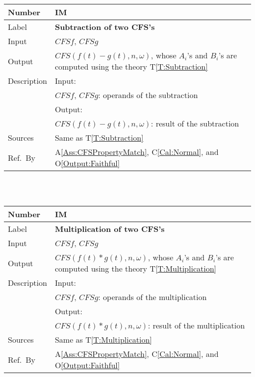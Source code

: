 \documentclass[12pt]{article}
\newcommand{\colAwidth}{0.13\textwidth}
\newcommand{\colBwidth}{0.82\textwidth}
\newcommand{\tref}[1]{T\ref{#1}}
\newcounter{instnum} %
\newcommand{\aref}[1]{A\ref{#1}}
\newcommand{\calref}[1]{C\ref{#1}}
\newcommand{\oref}[1]{O\ref{#1}}
\begin{document}
\noindent
\begin{minipage}{\textwidth}
	\renewcommand*{\arraystretch}{1.5}
	\begin{tabular}{| p{\colAwidth} | p{\colBwidth}|}
		\hline
		\rowcolor[gray]{0.9}
		Number& IM{instnum}\theinstnum 
		\label{IM:Subtraction}\\
		\hline
		Label& \bf Subtraction of two CFS's \\
		\hline
		Input& $\mathit{CFSf}$, $\mathit{CFSg}$\\
		\hline
		Output& $\mathit{CFS}(f(t)-g(t), n, \omega)$, whose $A_i$'s 
		and $B_i$'s are computed using the theory \tref{T:Subtraction}\\
		\hline
		Description&Input:\\
		&$\mathit{CFSf}$, $\mathit{CFSg}$: operands of the subtraction\\
		&Output:\\
		& $\mathit{CFS}(f(t)-g(t), n, \omega)$: result of the subtraction\\
		\hline
		Sources&Same as \tref{T:Subtraction}		\\
		\hline
		Ref.\ By & \aref{Ass:CFSPropertyMatch}, \calref{Cal:Normal}, 
		and \oref{Output:Faithful}\\
		\hline
	\end{tabular}
\end{minipage}\\
~\newline

\noindent
\begin{minipage}{\textwidth}
	\renewcommand*{\arraystretch}{1.5}
	\begin{tabular}{| p{\colAwidth} | p{\colBwidth}|}
		\hline
		\rowcolor[gray]{0.9}
		Number& IM{instnum}\theinstnum 
		\label{IM:Multiplication}\\
		\hline
		Label& \bf Multiplication of two CFS's \\
		\hline
		Input& $\mathit{CFSf}$, $\mathit{CFSg}$\\
		\hline
		Output& $\mathit{CFS}(f(t)*g(t), n, \omega)$, whose $A_i$'s 
		and $B_i$'s are computed using the theory 
		\tref{T:Multiplication}\\
		\hline
		Description&Input:\\
		&$\mathit{CFSf}$, $\mathit{CFSg}$: operands of the 
		multiplication\\
		&Output:\\
		& $\mathit{CFS}(f(t)*g(t), n, \omega)$: result 
		of the multiplication\\
		\hline
		Sources&Same as \tref{T:Multiplication}\\
		\hline
		Ref.\ By & \aref{Ass:CFSPropertyMatch}, \calref{Cal:Normal}, 
		and \oref{Output:Faithful}\\
		\hline
	\end{tabular}
\end{minipage}\\
~\newline
\end{document}
